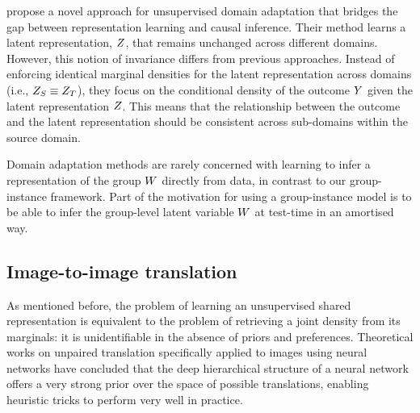 \documentclass[../thesis.tex]{subfiles}
\begin{document}
\citet{arjovskyInvariantRiskMinimization2019} propose a novel approach for unsupervised domain adaptation that bridges the gap between representation learning and causal inference. Their method learns a latent representation, $\myrv{z}$, that remains unchanged across different domains. However, this notion of invariance differs from previous approaches. Instead of enforcing identical marginal densities for the latent representation across domains (i.e., $\myrv{z}_S \equiv \myrv{z}_T$), they focus on the conditional density of the outcome $\myrv{y}$ given the latent representation $\myrv{z}$. This means that the relationship between the outcome and the latent representation should be consistent across sub-domains within the source domain. 

Domain adaptation methods are rarely concerned with learning to infer a representation of the group $\myrv{w}$ directly from data, in contrast to our group-instance framework. Part of the motivation for using a group-instance model is to be able to infer the group-level latent variable $\myrv{w}$ at test-time in an amortised way.

\subsection{Image-to-image translation}

As mentioned before, the problem of learning an unsupervised shared representation is equivalent to the problem of retrieving a joint density from its marginals: it is unidentifiable in the absence of priors and preferences. Theoretical works on unpaired translation specifically applied to images using neural networks \citep{galanti2018role, galanti2018generalization} have concluded that the deep hierarchical structure of a neural network offers a very strong prior over the space of possible translations, enabling heuristic tricks to perform very well in practice.
\end{document}
